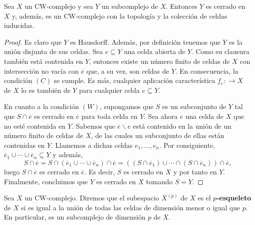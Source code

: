 \begin{teorema}
	Sea \(X\) un CW-complejo y sea \(Y\) un subcomplejo de \(X\). Entonces \(Y\) es cerrado en \(X\)  y, además, es un CW-complejo con la topología y la colección de celdas inducidas.
\end{teorema}
\begin{proof}
	Es claro que \(Y\) es Hausdorff. Además, por definición tenemos que \(Y\) es la unión disjunta 
	de sus celdas. Sea \(e \subseteq Y\) una celda abierta de \(Y\). Como su clausura también está contenida en \(Y\), entonces existe un número finito de celdas de \(X\) con intersección no vacía con \(\overline{e}\) que, a su vez, son celdas de \(Y\). En consecuencia, la condición \((C)\) se cumple. Es más, cualquier aplicación característica \(f_e : \to X\) de \(X\) lo es también de \(Y\) para cualquier celda \(e \subseteq Y\).
	
	En cuanto a la condición \((W)\), supongamos que \(S\) es un subconjunto de \(Y\) tal que \(S \cap \overline{e}\) es cerrado en \(\overline{e}\) para toda celda en \(Y\). Sea ahora \(e\) una celda de \(X\) que no esté contenida en \(Y\). Sabemos que \(\overline{e} \backslash e\) está contenido en la unión de un número finito de celdas de \(X\), de las cuales un subconjunto de ellas están contenidas en \(Y\). Llamemos a dichas celdas \(e_1, \ldots, e_n\). Por consiguiente, \(\overline{e}_1 \cup \cdots \cup \overline{e}_n \subseteq Y\) y además,
	\[
		S \cap \overline{e} = S \cap (\overline{e}_1 \cup \cdots \cup \overline{e}_n) \cap \overline{e} = \left( (S \cap \overline{e}_1) \cup \cdots \cap (S \cap \overline{e}_n) \right) \cap \overline{e},
	\]  
	luego \(S \cap \overline{e}\) es cerrado en \(\overline{e}\). Es decir, \(S\) es cerrado en \(X\) y por tanto en \(Y\). Finalmente, concluimos que \(Y\) es cerrado en \(X\) tomando \(S = Y\).
\end{proof}

\begin{definicion}
	Sea \(X\) un CW-complejo. Diremos que el subespacio \(X^{(p)}\) de \(X\) es el \textbf{\(p\)-esqueleto} de \(X\) si es igual a la unión de todas las celdas de dimensión menor o igual que \(p\). En particular, es un subcomplejo de dimensión \(p\) de \(X\).
\end{definicion}

